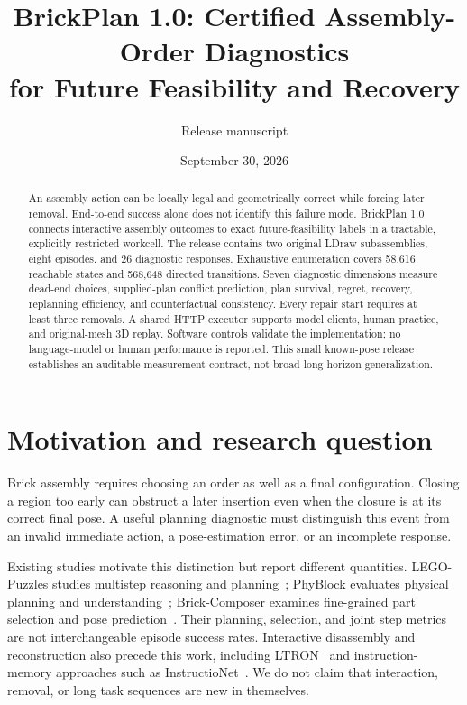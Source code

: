 \documentclass[10pt,twocolumn]{article}
\title{BrickPlan 1.0: Certified Assembly-Order Diagnostics\\for Future Feasibility and Recovery}
\author{Release manuscript}
\date{September 30, 2026}
\begin{document}
\maketitle
\begin{abstract}
An assembly action can be locally legal and geometrically correct while forcing
later removal. End-to-end success alone does not identify this failure mode.
BrickPlan 1.0 connects interactive assembly outcomes to exact future-feasibility
labels in a tractable, explicitly restricted workcell. The release contains two
original LDraw subassemblies, eight episodes, and 26 diagnostic responses.
Exhaustive enumeration covers 58,616 reachable states and 568,648 directed
transitions. Seven diagnostic dimensions measure dead-end choices, supplied-plan
conflict prediction, plan survival, regret, recovery, replanning efficiency, and
counterfactual consistency. Every repair start requires at least three removals.
A shared HTTP executor supports model clients, human practice, and original-mesh
3D replay. Software controls validate the implementation; no language-model or
human performance is reported. This small known-pose release establishes an
auditable measurement contract, not broad long-horizon generalization.
\end{abstract}

\section{Motivation and research question}
Brick assembly requires choosing an order as well as a final configuration.
Closing a region too early can obstruct a later insertion even when the closure
is at its correct final pose. A useful planning diagnostic must distinguish
this event from an invalid immediate action, a pose-estimation error, or an
incomplete response.

Existing studies motivate this distinction but report different quantities.
LEGO-Puzzles studies multistep reasoning and planning~\cite{legopuzzles};
PhyBlock evaluates physical planning and understanding~\cite{phyblock};
Brick-Composer examines fine-grained part selection and pose prediction~\cite{composer}.
Their planning, selection, and joint step metrics are not interchangeable
episode success rates. Interactive disassembly and reconstruction also precede
this work, including LTRON~\cite{ltron} and instruction-memory approaches such as
InstructioNet~\cite{instructionet}. We do not claim that interaction, removal,
or long task sequences are new in themselves.
\end{document}
